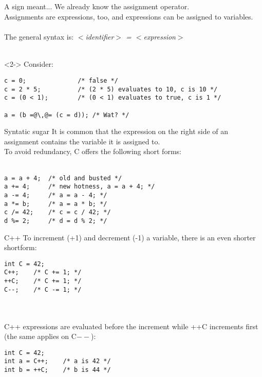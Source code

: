 \subsection{}
\begin{frame}[fragile]{A sign meant...}
	We already know the assignment operator.\\
	Assignments are expressions, too, and expressions can be assigned to variables.\\\ \\
	The general syntax is:	\textit{$<$identifier$>$ = $<$expression$>$}\\\ \\
	
	\begin{uncoverenv}<2->
		Consider:
		\begin{lstlisting}[numbers=none]
c = 0;				/* false */
c = 2 * 5;			/* (2 * 5) evaluates to 10, c is 10 */
c = (0 < 1);		/* (0 < 1) evaluates to true, c is 1 */

a = (b =@\,@= (c = d));	/* Wat? */
\end{lstlisting}
	\end{uncoverenv}
\end{frame}
\begin{frame}[fragile]{Syntatic sugar}
	It is common that the expression on the right side of an assignment contains the variable it is assigned to.\\
	To avoid redundancy, C offers the following short forms:\\\ \\
	\begin{lstlisting}[numbers=none]
a = a + 4;	/* old and busted */
a += 4;		/* new hotness, a = a + 4; */
a -= 4;		/* a = a - 4; */
a *= b;		/* a = a * b; */
c /= 42;	/* c = c / 42; */
d %= 2;		/* d = d % 2; */
\end{lstlisting}
\end{frame}
\begin{frame}[fragile]{C++}
	To increment (+1) and decrement (-1) a variable, there is an even shorter shortform:
	\begin{lstlisting}[numbers=none]
int C = 42;
C++;	/* C += 1; */
++C;	/* C += 1; */
C--;	/* C -= 1; */
\end{lstlisting}
\ \\\ \\C++ expressions are evaluated before the increment while ++C increments first (the same applies on C$--$):
	\begin{lstlisting}[numbers=none]
int C = 42;
int a = C++;	/* a is 42 */
int b = ++C;	/* b is 44 */
\end{lstlisting}
\end{frame}
